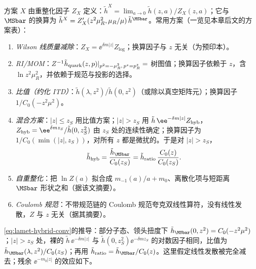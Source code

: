 \begin{definition}[准关联函数的重整化方案]\label{def:lamet-schemes}
方案 $X$ 由重整化因子 $Z_X$ 定义：$\tilde h^X=\lim_{a\to0}\tilde h(z,a)/Z_X(z,a)$；它与 $\MSbar$ 的换算为 $\tilde h^X=Z'_X(z^2\mu_R^2,\mu_R/\mu)\,\tilde h^{\MSbar}$\cite{IzubuchiEtAl2018}。常用方案（一览见本章后文的方案表）：
\begin{enumerate}[label=(\roman*),leftmargin=2em,itemsep=1pt,topsep=2pt]
\item \emph{Wilson 线质量减除}：$Z_X=\ee^{\delta m|z|}Z_{\log}$；换算因子与 $z$ 无关\cite{Chen:2016fxx,Ishikawa:2016znu,Green:2017xeu}（\cite{Ishikawa:2016znu}为预印本）。
\item \emph{RI/MOM}：$Z^{-1}\tilde h_{\rm quark}(z,p)|_{p^2=-\mu_R^2,\,p^z=p^z_R}=$ 树图值；换算因子依赖于 $z$，含 $\ln z^2\mu_R^2$，并依赖于规范与投影的选择\cite{Constantinou:2017sej,Stewart:2017tvs,Alexandrou:2017huk,Chen:2017mzz,LatticeParton:2018gjr}。
\item \emph{比值（约化 ITD）}：$\tilde h(\lambda,z^2)/\tilde h(0,z^2)$（或除以真空矩阵元）；换算因子 $1/C_0(-z^2\mu^2)$\cite{Radyushkin2017,Orginos:2017kos,Braun:2018brg}。
\item \emph{混合方案}：$|z|\le z_S$ 用比值方案；$|z|>z_S$ 用 $\tilde h\,\ee^{-\delta m|z|}Z_{\rm hyb}$，$Z_{\rm hyb}=\ee^{\delta mz_S}/\tilde h(0,z_S^2)$ 由 $z_S$ 处的连续性确定；换算因子为 $1/C_0(\min(|z|,z_S))$，对所有 $z$ 都是微扰的\cite{Ji:2020brr}。于是对 $|z|>z_S$，
\begin{equation}\label{eq:lamet-hybrid-conv}
\tilde h_{\rm hyb}=\frac{\tilde h_{\MSbar}}{C_0(z_S)}=\tilde h_{\rm ratio}\,\frac{C_0(z)}{C_0(z_S)} .
\end{equation}%
\item \emph{自重整化}：把 $\ln Z(a)$ 拟合成 $m_{-1}(a)/a+m_0$、离散化项与短距离 $\MSbar$ 形状之和\cite{LatticePartonLPC:2021gpi}（据该文摘要）。
\item \emph{Coulomb 规范}：不带规范链的 Coulomb 规范夸克双线性算符，没有线性发散，$Z$ 与 $z$ 无关\cite{Gao:2023lny,Zhao:2023ptv}（据其摘要）。
\end{enumerate}
\end{definition}

\cref{eq:lamet-hybrid-conv}的推导：部分子态、领头扭度下 $\tilde h_{\MSbar}(0,z^2)=C_0(-z^2\mu^2)$；$|z|>z_S$ 处，裸的 $\tilde h\,\ee^{-\delta m|z|}$ 与 $\tilde h(0,z_S^2)\ee^{-\delta mz_S}$ 的对数因子相同，比值为 $\tilde h_{\MSbar}(\lambda,z^2)/C_0(z_S)$；再用 $\tilde h_{\rm ratio}=\tilde h_{\MSbar}/C_0(z)$。这里假定线性发散被完全减去；残余 $\ee^{-m_0|z|}$ 的效应如下。

